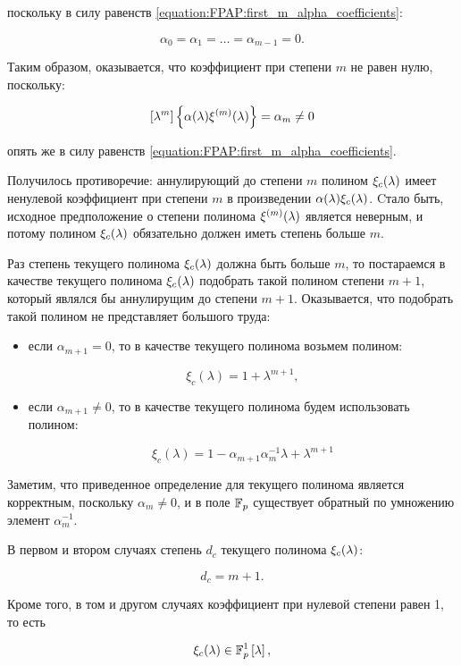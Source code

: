 поскольку в силу равенств \eqref{equation:FPAP:first_m_alpha_coefficients}:

	$$ \alpha_0 = \alpha_1 = \dots = \alpha_{m-1} = 0. $$

Таким образом, оказывается, что коэффициент при степени $m$ не равен нулю, поскольку:

	$$ \left [ \lambda^{m} \right ] \left \{ \alpha (\lambda) \xi^{(m)} (\lambda) \right \} = \alpha_m \neq 0 $$

опять же в силу равенств \eqref{equation:FPAP:first_m_alpha_coefficients}.

Получилось противоречие: аннулирующий до степени $m$ полином $\xi_c (\lambda)$ имеет ненулевой коэффициент при степени $m$ в произведении
$\alpha (\lambda) \xi_c (\lambda)$. Cтало быть, исходное предположение о степени полинома $\xi^{(m)} (\lambda)$ является неверным, и
потому полином $\xi_c (\lambda)$ обязательно должен иметь степень больше $m$.

Раз степень текущего полинома $\xi_c (\lambda)$ должна быть больше $m$, то постараемся в качестве текущего полинома $\xi_c (\lambda)$
подобрать такой полином степени $m+1$, который являлся бы аннулирущим до степени $m+1$. Оказывается, что подобрать такой полином не представляет
большого труда:

\begin{itemize}
	\item если $\alpha_{m+1} = 0$, то в качестве текущего полинома возьмем полином:

		$$ \xi_c(\lambda) = 1 + \lambda^{m+1}, $$

	\item если $\alpha_{m+1} \neq 0$,  то в качестве текущего полинома будем использовать полином:

		$$ \xi_c(\lambda) = 1 - \alpha_{m+1}\alpha_m^{-1} \lambda + \lambda^{m+1} $$
\end{itemize}

Заметим, что приведенное определение для текущего полинома является корректным, поскольку $\alpha_m \neq 0$, и в поле $\mathbb{F}_p$ существует
обратный по умножению элемент $\alpha_m^{-1}$.

В первом и втором случаях степень $d_c$ текущего полинома $\xi_c (\lambda)$:

	$$ d_c = m+1. $$

Кроме того, в том и другом случаях коэффициент при нулевой степени равен 1, то есть

	$$ \xi_c (\lambda) \in \mathbb{F}_p^1 \left [ \lambda \right ], $$


